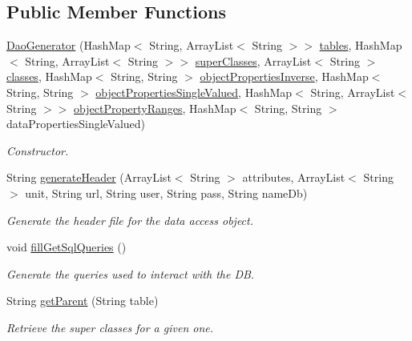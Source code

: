 \subsection*{Public Member Functions}
\begin{DoxyCompactItemize}
\item 
\hyperlink{class_classes_c_p_p_1_1_dao_generator_af3eca263b77e9d6621dc7fa18cc997d1}{DaoGenerator} (HashMap$<$ String, ArrayList$<$ String $>$$>$ \hyperlink{class_classes_c_p_p_1_1_dao_generator_aac7347b462abcc6c13537cb2742db47a}{tables}, HashMap$<$ String, ArrayList$<$ String $>$$>$ \hyperlink{class_classes_c_p_p_1_1_dao_generator_a82c17c8ceb0920fdb5550acd119418e3}{superClasses}, ArrayList$<$ String $>$ \hyperlink{class_classes_c_p_p_1_1_dao_generator_a1d8a1ed16c117296a86cf50de991f6c3}{classes}, HashMap$<$ String, String $>$ \hyperlink{class_classes_c_p_p_1_1_dao_generator_abe833faf455358b4acfbb6094a79aac2}{objectPropertiesInverse}, HashMap$<$ String, String $>$ \hyperlink{class_classes_c_p_p_1_1_dao_generator_a3173466faa066f9caea2e5dcaba3b330}{objectPropertiesSingleValued}, HashMap$<$ String, ArrayList$<$ String $>$$>$ \hyperlink{class_classes_c_p_p_1_1_dao_generator_af8c39fd61441c9eaa88b350a7890c347}{objectPropertyRanges}, HashMap$<$ String, String $>$ dataPropertiesSingleValued)
\begin{DoxyCompactList}\small\item\em Constructor. \end{DoxyCompactList}\item 
String \hyperlink{class_classes_c_p_p_1_1_dao_generator_a44f55de6d8745c30025b78d9b17db0bc}{generateHeader} (ArrayList$<$ String $>$ attributes, ArrayList$<$ String $>$ unit, String url, String user, String pass, String nameDb)
\begin{DoxyCompactList}\small\item\em Generate the header file for the data access object. \end{DoxyCompactList}\item 
void \hyperlink{class_classes_c_p_p_1_1_dao_generator_a8cf53076ae7d1c6032e3c8a85747dddf}{fillGetSqlQueries} ()
\begin{DoxyCompactList}\small\item\em Generate the queries used to interact with the DB. \end{DoxyCompactList}\item 
String \hyperlink{class_classes_c_p_p_1_1_dao_generator_aef6508498c44300406cd431b8a1c934d}{getParent} (String table)
\begin{DoxyCompactList}\small\item\em Retrieve the super classes for a given one. \end{DoxyCompactList}\item 
$$
\end{DoxyCompactItemize}
